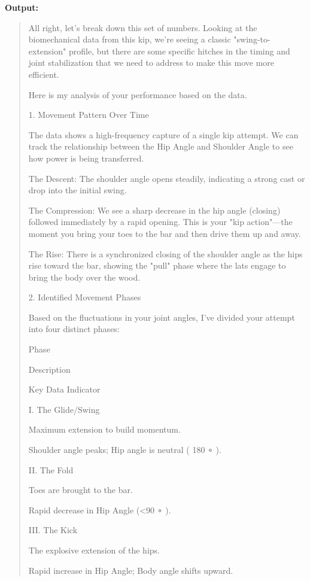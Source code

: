 \textbf{Output:}

\begin{quote}
    All right, let's break down this set of numbers. Looking at the biomechanical data from this kip, we’re seeing a classic "swing-to-extension" profile, but there are some specific hitches in the timing and joint stabilization that we need to address to make this move more efficient.
    
    Here is my analysis of your performance based on the data.
    
    1. Movement Pattern Over Time
    
    The data shows a high-frequency capture of a single kip attempt. We can track the relationship between the Hip Angle and Shoulder Angle to see how power is being transferred.
    
    The Descent: The shoulder angle opens steadily, indicating a strong cast or drop into the initial swing.
    
    The Compression: We see a sharp decrease in the hip angle (closing) followed immediately by a rapid opening. This is your "kip action"—the moment you bring your toes to the bar and then drive them up and away.
    
    The Rise: There is a synchronized closing of the shoulder angle as the hips rise toward the bar, showing the "pull" phase where the lats engage to bring the body over the wood.
    
    2. Identified Movement Phases
    
    Based on the fluctuations in your joint angles, I’ve divided your attempt into four distinct phases:
    
    Phase
    
    Description
    
    Key Data Indicator
    
    I. The Glide/Swing
    
    Maximum extension to build momentum.
    
    Shoulder angle peaks; Hip angle is neutral ( 180 ∘ ).
    
    II. The Fold
    
    Toes are brought to the bar.
    
    Rapid decrease in Hip Angle (<90 ∘ ).
    
    III. The Kick
    
    The explosive extension of the hips.
    
    Rapid increase in Hip Angle; Body angle shifts upward.
    

\end{quote}
